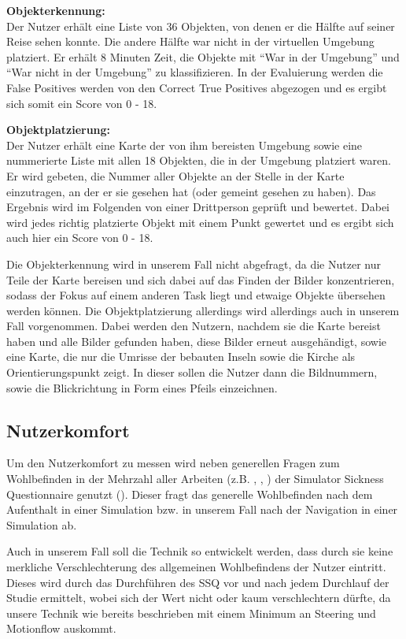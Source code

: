 \textbf{Objekterkennung:}\\
Der Nutzer erhält eine Liste von 36 Objekten, von denen er die Hälfte auf seiner Reise sehen konnte. Die andere Hälfte war nicht in der virtuellen Umgebung platziert. Er erhält 8 Minuten Zeit, die Objekte mit “War in der Umgebung” und “War nicht in der Umgebung” zu klassifizieren. In der Evaluierung werden die False Positives werden von den Correct True Positives abgezogen und es ergibt sich somit ein Score von 0 - 18.


\textbf{Objektplatzierung:}\\
Der Nutzer erhält eine Karte der von ihm bereisten Umgebung sowie eine nummerierte Liste mit allen 18 Objekten, die in der Umgebung platziert waren. 
Er wird gebeten, die Nummer aller Objekte an der Stelle in der Karte einzutragen, an der er sie gesehen hat (oder gemeint gesehen zu haben).
Das Ergebnis wird im Folgenden von einer Drittperson geprüft und bewertet.
Dabei wird jedes richtig platzierte Objekt mit einem Punkt gewertet und es ergibt sich auch hier ein Score von 0 - 18. 

Die Objekterkennung wird in unserem Fall nicht abgefragt, da die Nutzer nur Teile der Karte bereisen und sich dabei auf das Finden der Bilder konzentrieren, sodass der Fokus auf einem anderen Task liegt und etwaige Objekte übersehen werden können.
Die Objektplatzierung allerdings wird allerdings auch in unserem Fall vorgenommen. Dabei werden den Nutzern, nachdem sie die Karte bereist haben und alle Bilder gefunden haben, diese Bilder erneut ausgehändigt, sowie eine Karte, die nur die Umrisse der bebauten \glqq Inseln \grqq{} sowie die Kirche als Orientierungspunkt zeigt.
In dieser sollen die Nutzer dann die Bildnummern, sowie die Blickrichtung in Form eines Pfeils einzeichnen.


\subsection{Nutzerkomfort}
Um den Nutzerkomfort zu messen wird neben generellen Fragen zum Wohlbefinden in der Mehrzahl aller Arbeiten (z.B. \cite{Krekhov2018GulliVR}, \cite{Suma2010EvaluationEnvironments}, \cite{Usoh1999WalkingEnvironments}) der Simulator Sickness Questionnaire genutzt (\cite{Kennedy1993SimulatorSickness}). Dieser fragt das generelle Wohlbefinden nach dem Aufenthalt in einer Simulation bzw. in unserem Fall nach der Navigation in einer Simulation ab.

Auch in unserem Fall soll die Technik so entwickelt werden, dass durch sie keine merkliche Verschlechterung des allgemeinen Wohlbefindens der Nutzer eintritt. Dieses wird durch das Durchführen des SSQ vor und nach jedem Durchlauf der Studie ermittelt, wobei sich der Wert nicht oder kaum  verschlechtern dürfte, da unsere Technik wie bereits beschrieben mit einem Minimum an Steering und Motionflow auskommt.

